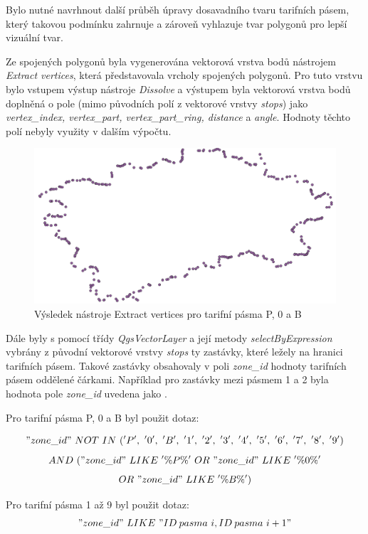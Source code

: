 Bylo nutné navrhnout další průběh úpravy dosavadního tvaru tarifních pásem, který takovou podmínku zahrnuje
a zároveň vyhlazuje tvar polygonů pro lepší vizuální tvar.  

Ze spojených polygonů byla vygenerována vektorová vrstva bodů nástrojem
\textit{Extract vertices}, která představovala vrcholy spojených polygonů. Pro tuto vrstvu
bylo vstupem výstup nástroje \textit{Dissolve} a výstupem byla vektorová vrstva bodů 
doplněná o pole (mimo původních polí z vektorové vrstvy \textit{stops}) jako \textit{vertex\_index,
vertex\_part, vertex\_part\_ring, distance} a \textit{angle}.
Hodnoty těchto polí nebyly využity v dalším výpočtu.

\begin{figure}[H] \centering
    \includegraphics[width=400pt]{./pictures/vertices-P0B.png}
    \caption[Výsledek nástroje Extract vertices]{Výsledek nástroje Extract vertices pro tarifní pásma P, 0 a B}
	\label{fig:vertices-P0B}              
\end{figure} 

Dále byly s pomocí třídy \textit{QgsVectorLayer} a její metody \textit{selectByExpression} vybrány 
z původní vektorové vrstvy \textit{stops} ty zastávky, které ležely na hranici tarifních pásem.
Takové zastávky obsahovaly v poli \textit{zone\_id} hodnoty tarifních pásem od\-dělené čárkami.
Například pro zastávky mezi pásmem 1 a 2 byla hodnota pole \textit{zone\_id} uvedena jako .

Pro tarifní pásma P, 0 a B byl použit dotaz:

\["zone\_id"\ NOT\ IN\ ('P',\ '0',\ 'B',\ '1',\ '2',\ '3',\ '4',\ '5',\ '6',\ '7',\ '8',\ '9')\]
\[AND\ ("zone\_id"\ LIKE\ '\%P\%'\ OR\ "zone\_id"\ LIKE\ '\%0\%'\]
\[OR\ "zone\_id"\ LIKE\ '\%B\%')\]

Pro tarifní pásma 1 až 9 byl použit dotaz:
\["zone\_id"\ LIKE\ "ID\: pasma\ i,ID\: pasma\ i+1"\]

